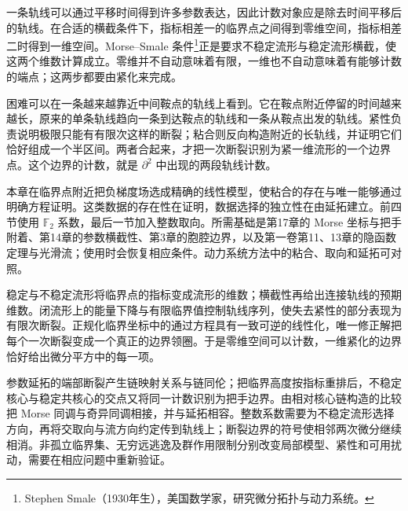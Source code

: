 一条轨线可以通过平移时间得到许多参数表达，因此计数对象应是除去时间平移后的轨线。在合适的横截条件下，指标相差一的临界点之间得到零维空间，指标相差二时得到一维空间。Morse--Smale 条件\footnote{Stephen Smale（1930年生），美国数学家，研究微分拓扑与动力系统。}正是要求不稳定流形与稳定流形横截，使这两个维数计算成立。零维并不自动意味着有限，一维也不自动意味着有能够计数的端点；这两步都要由紧化来完成。

\ProseParagraphBreak

困难可以在一条越来越靠近中间鞍点的轨线上看到。它在鞍点附近停留的时间越来越长，原来的单条轨线趋向一条到达鞍点的轨线和一条从鞍点出发的轨线。紧性负责说明极限只能有有限次这样的断裂；粘合则反向构造附近的长轨线，并证明它们恰好组成一个半区间。两者合起来，才把一次断裂识别为紧一维流形的一个边界点。这个边界的计数，就是 \(\partial^2\) 中出现的两段轨线计数。

\ProseParagraphBreak

本章在临界点附近把负梯度场选成精确的线性模型，使粘合的存在与唯一能够通过明确方程证明。这类数据的存在性在证明，数据选择的独立性在由延拓建立。前四节使用 \(\mathbb F_2\) 系数，最后一节加入整数取向。所需基础是第17章的 Morse 坐标与把手附着、第14章的参数横截性、第3章的胞腔边界，以及第一卷第11、13章的隐函数定理与光滑流；使用时会恢复相应条件。动力系统方法中的粘合、取向和延拓可对照\cite[第3.3--3.4节，第4.1--4.2节]{Weber2006Morse}。







\begin{chaptersummary}
	稳定与不稳定流形将临界点的指标变成流形的维数；横截性再给出连接轨线的预期维数。闭流形上的能量下降与有限临界值控制轨线序列，使失去紧性的部分表现为有限次断裂。正规化临界坐标中的通过方程具有一致可逆的线性化，唯一修正解把每个一次断裂变成一个真正的边界领圈。于是零维空间可以计数，一维紧化的边界恰好给出微分平方中的每一项。

	\ProseParagraphBreak

	参数延拓的端部断裂产生链映射关系与链同伦；把临界高度按指标重排后，不稳定核心与稳定共核心的交点又将同一计数识别为把手边界。由相对核心链构造的比较把 Morse 同调与奇异同调相接，并与延拓相容。整数系数需要为不稳定流形选择方向，再将交取向与流方向约定传到轨线上；断裂边界的符号使相邻两次微分继续相消。非孤立临界集、无穷远逃逸及群作用限制分别改变局部模型、紧性和可用扰动，需要在相应问题中重新验证。
\end{chaptersummary}

